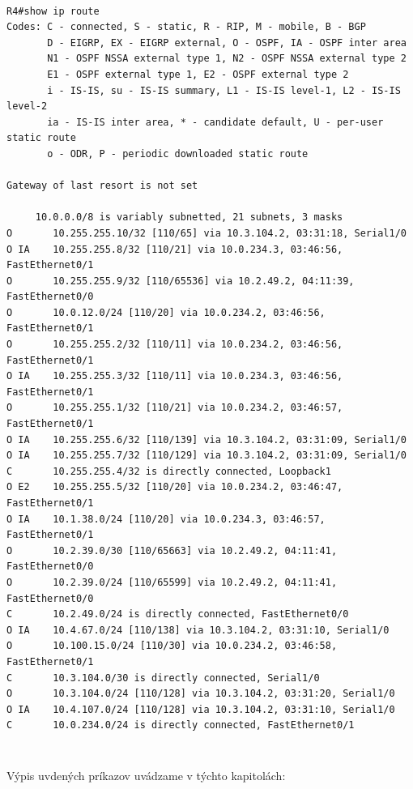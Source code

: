 \documentclass[12pt,twoside,a4paper]{article}
\begin{document}
\noindent
{\selectfont
\begin{small}
\begin{verbatim}

R4#show ip route
Codes: C - connected, S - static, R - RIP, M - mobile, B - BGP
       D - EIGRP, EX - EIGRP external, O - OSPF, IA - OSPF inter area 
       N1 - OSPF NSSA external type 1, N2 - OSPF NSSA external type 2
       E1 - OSPF external type 1, E2 - OSPF external type 2
       i - IS-IS, su - IS-IS summary, L1 - IS-IS level-1, L2 - IS-IS level-2
       ia - IS-IS inter area, * - candidate default, U - per-user static route
       o - ODR, P - periodic downloaded static route

Gateway of last resort is not set

     10.0.0.0/8 is variably subnetted, 21 subnets, 3 masks
O       10.255.255.10/32 [110/65] via 10.3.104.2, 03:31:18, Serial1/0
O IA    10.255.255.8/32 [110/21] via 10.0.234.3, 03:46:56, FastEthernet0/1
O       10.255.255.9/32 [110/65536] via 10.2.49.2, 04:11:39, FastEthernet0/0
O       10.0.12.0/24 [110/20] via 10.0.234.2, 03:46:56, FastEthernet0/1
O       10.255.255.2/32 [110/11] via 10.0.234.2, 03:46:56, FastEthernet0/1
O IA    10.255.255.3/32 [110/11] via 10.0.234.3, 03:46:56, FastEthernet0/1
O       10.255.255.1/32 [110/21] via 10.0.234.2, 03:46:57, FastEthernet0/1
O IA    10.255.255.6/32 [110/139] via 10.3.104.2, 03:31:09, Serial1/0
O IA    10.255.255.7/32 [110/129] via 10.3.104.2, 03:31:09, Serial1/0
C       10.255.255.4/32 is directly connected, Loopback1
O E2    10.255.255.5/32 [110/20] via 10.0.234.2, 03:46:47, FastEthernet0/1
O IA    10.1.38.0/24 [110/20] via 10.0.234.3, 03:46:57, FastEthernet0/1
O       10.2.39.0/30 [110/65663] via 10.2.49.2, 04:11:41, FastEthernet0/0
O       10.2.39.0/24 [110/65599] via 10.2.49.2, 04:11:41, FastEthernet0/0
C       10.2.49.0/24 is directly connected, FastEthernet0/0
O IA    10.4.67.0/24 [110/138] via 10.3.104.2, 03:31:10, Serial1/0
O       10.100.15.0/24 [110/30] via 10.0.234.2, 03:46:58, FastEthernet0/1
C       10.3.104.0/30 is directly connected, Serial1/0
O       10.3.104.0/24 [110/128] via 10.3.104.2, 03:31:20, Serial1/0
O IA    10.4.107.0/24 [110/128] via 10.3.104.2, 03:31:10, Serial1/0
C       10.0.234.0/24 is directly connected, FastEthernet0/1


\end{verbatim}
\end{small}
}

\subparagraph{}
Výpis uvdených príkazov uvádzame v týchto kapitolách:
\end{document}
